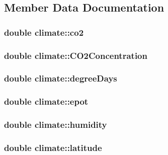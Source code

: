 \subsection{Member Data Documentation}
\hypertarget{classclimate_a65129fa9985c1632cabdfbe0acb7f3b3}{
\subsubsection[{co2}]{\setlength{\rightskip}{0pt plus 5cm}double {\bf climate::co2}}}
\label{classclimate_a65129fa9985c1632cabdfbe0acb7f3b3}
\hypertarget{classclimate_a2f19a73386166431b453c98dc49605d8}{
\subsubsection[{CO2Concentration}]{\setlength{\rightskip}{0pt plus 5cm}double {\bf climate::CO2Concentration}}}
\label{classclimate_a2f19a73386166431b453c98dc49605d8}
\hypertarget{classclimate_adfc5281b9c32f6aabffc6636998ada60}{
\subsubsection[{degreeDays}]{\setlength{\rightskip}{0pt plus 5cm}double {\bf climate::degreeDays}}}
\label{classclimate_adfc5281b9c32f6aabffc6636998ada60}
\hypertarget{classclimate_a351a558d1f1df4dda77edf981a436c07}{
\subsubsection[{epot}]{\setlength{\rightskip}{0pt plus 5cm}double {\bf climate::epot}}}
\label{classclimate_a351a558d1f1df4dda77edf981a436c07}
\hypertarget{classclimate_a06eef65b4caa3f2fd845f5f0e28420d8}{
\subsubsection[{humidity}]{\setlength{\rightskip}{0pt plus 5cm}double {\bf climate::humidity}}}
\label{classclimate_a06eef65b4caa3f2fd845f5f0e28420d8}
\hypertarget{classclimate_a60a6dc47a31d34a212865825bed24352}{
\subsubsection[{latitude}]{\setlength{\rightskip}{0pt plus 5cm}double {\bf climate::latitude}}}
